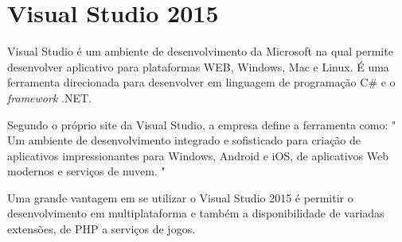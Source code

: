 	\section{Visual Studio 2015}
\label{sec:Visual Studio 2015}

Visual Studio é um ambiente de desenvolvimento da Microsoft na qual permite desenvolver aplicativo para plataformas WEB, Windows, Mac e Linux. É uma ferramenta direcionada para desenvolver em linguagem de programação C\# e o \textit{framework} .NET.

Segundo o próprio site da Visual Studio, a empresa define a ferramenta como: " Um ambiente de desenvolvimento integrado e sofisticado para criação de aplicativos impressionantes para Windows, Android e iOS, de aplicativos Web modernos e serviços de nuvem. " 

Uma grande vantagem em se utilizar o Visual Studio 2015 é permitir o desenvolvimento em multiplataforma e também a disponibilidade de variadas extensões, de PHP a serviços de jogos. \cite{vs}
